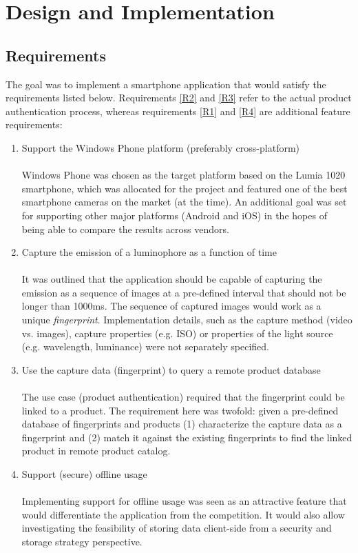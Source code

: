 \documentclass[thesis.tex]{subfiles}
\begin{document}
\chapter{Design and Implementation}
\label{chapter:design-implementation}

\section{Requirements}

The goal was to implement a smartphone application that would satisfy the requirements listed below. Requirements \ref{R2} and \ref{R3} refer to the actual product authentication process, whereas requirements \ref{R1} and \ref{R4} are additional feature requirements:

\begin{enumerate}[leftmargin=0.55in, label=\textbf{R\arabic*}]
	\item \label{R1} Support the Windows Phone platform (preferably cross-platform)\\ \\
	Windows Phone was chosen as the target platform based on the Lumia 1020 smartphone, which was allocated for the project and featured one of the best smartphone cameras on the market (at the time). An additional goal was set for supporting other major platforms (Android and iOS) in the hopes of being able to compare the results across vendors.

    \item \label{R2} Capture the emission of a luminophore as a function of time\\ \\
    It was outlined that the application should be capable of capturing the emission as a sequence of images at a pre-defined interval that should not be longer than 1000ms. The sequence of captured images would work as a unique \emph{fingerprint}. Implementation details, such as the capture method (video vs. images), capture properties (e.g. ISO) or properties of the light source (e.g. wavelength, luminance) were not separately specified.

    \item \label{R3} Use the capture data (fingerprint) to query a remote product database\\ \\
    The use case (product authentication) required that the fingerprint could be linked to a product. The requirement here was twofold: given a pre-defined database of fingerprints and products (1) characterize the capture data as a fingerprint and (2) match it against the existing fingerprints to find the linked product in remote product catalog.

	\item \label{R4} Support (secure) offline usage\\ \\
	Implementing support for offline usage was seen as an attractive feature that would differentiate the application from the competition. It would also allow investigating the feasibility of storing data client-side from a security and storage strategy perspective.
\end{enumerate}
\end{document}
